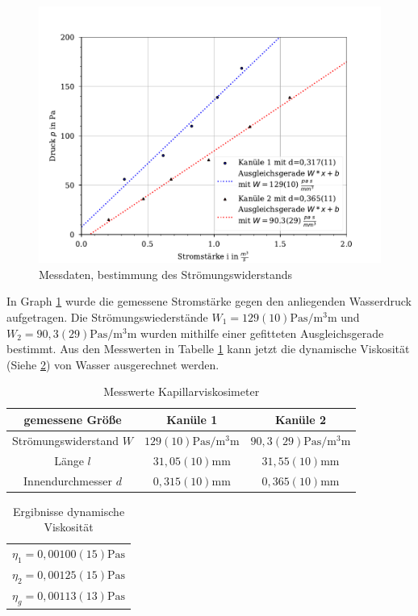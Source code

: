 \documentclass[11pt, a4paper]{article}
\begin{document}
    \begin{figure}
        \centering
        \includegraphics[width=\textwidth]{./1Plot.pdf}

        \caption{Messdaten, bestimmung des Strömungswiderstands}
        \label{fig:mess}
    \end{figure}
    In Graph \ref{fig:mess} wurde die gemessene Stromstärke gegen den anliegenden Wasserdruck aufgetragen.
    Die Strömungswiederstände $W_1 = 129(10) \si{\pascal\second\per\cubic\milli\metre}$ und 
    $W_2 = 90,3(29) \si{\pascal\second\per\cubic\milli\metre}$ wurden mithilfe einer gefitteten Ausgleichsgerade
    bestimmt. Aus den Messwerten in Tabelle \ref{tab:mess2} kann jetzt die dynamische Viskosität (Siehe \ref{tab:erg1}) von Wasser
    ausgerechnet werden.
    \begin{table}
        \centering
        \begin{tabular}{c c c}
            gemessene Größe & Kanüle 1 & Kanüle 2 \\ \hline
            Strömungswiderstand $W$ & $129(10) \si{\pascal\second\per\cubic\milli\metre}$ & $90,3(29) \si{\pascal\second\per\cubic\milli\metre}$ \\
            Länge $l$ & $31,05(10) \si{\milli\metre}$ & $31,55(10) \si{\milli\metre}$ \\
            Innendurchmesser $d$ & $0,315(10) \si{\milli\metre}$ & $0,365(10) \si{\milli\metre}$
            
        \end{tabular}
        \caption{Messwerte Kapillarviskosimeter}
        \label{tab:mess2}
    \end{table}
    \begin{table}
        \centering
        \begin{tabular}{c}
            $\eta_1 = 0,00100(15) \si{\pascal \second}$ \\
            $\eta_2 = 0,00125(15) \si{\pascal \second} $ \\
            $\eta_g = 0,00113(13) \si{\pascal \second} $ \\
        \end{tabular}
        \caption{Ergibnisse dynamische Viskosität}
        \label{tab:erg1}
    \end{table}
\end{document}

